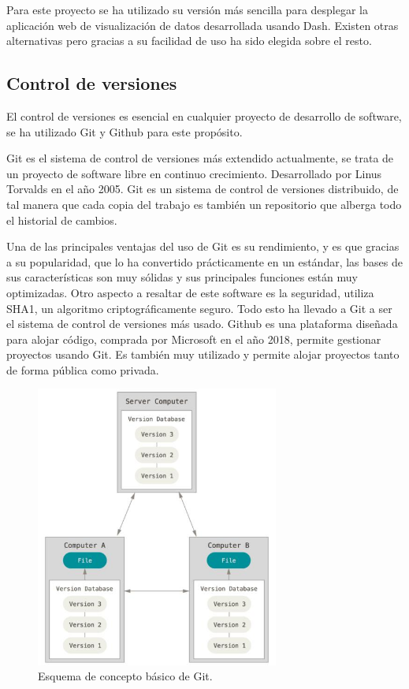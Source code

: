 \documentclass[a4paper, 12pt, oneside]{book}
\begin{document}
Para este proyecto se ha utilizado su versión más sencilla para desplegar la aplicación web de visualización de datos desarrollada usando Dash. Existen otras alternativas pero gracias a su facilidad de uso ha sido elegida sobre el resto.


\subsection{Control de versiones}
\label{subsec:control versiones}

El control de versiones es esencial en cualquier proyecto de desarrollo de software, se ha utilizado Git y Github para este propósito.

Git es el sistema de control de versiones más extendido actualmente, se trata de un proyecto de software libre en continuo crecimiento. Desarrollado por Linus Torvalds en el año 2005. Git es un sistema de control de versiones distribuido, de tal manera que cada copia del trabajo es también un repositorio que alberga todo el historial de cambios.

Una de las principales ventajas del uso de Git es su rendimiento, y es que gracias a su popularidad, que lo ha convertido prácticamente en un estándar, las bases de sus características son muy sólidas y sus principales funciones están muy optimizadas. Otro aspecto a resaltar de este software es la seguridad, utiliza SHA1, un algoritmo criptográficamente seguro. Todo esto ha llevado a Git a ser el sistema de control de versiones más usado.
Github es una plataforma diseñada para alojar código, comprada por Microsoft en el año 2018, permite gestionar proyectos usando Git. Es también muy utilizado y permite alojar proyectos tanto de forma pública como privada.

\begin{figure}[H]
	\centering
    \includegraphics[width=8cm, keepaspectratio]{img/git}
    \caption{Esquema de concepto básico de Git.}
    \label{figura:esquema_git}
\end{figure}
\end{document}
